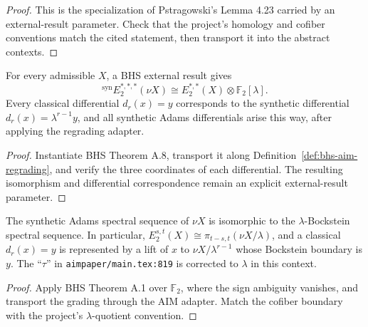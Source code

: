\begin{proof}
  This is the specialization of Pstragowski's Lemma 4.23 carried by an
  external-result parameter.  Check that the project's homology and cofiber
  conventions match the cited statement, then transport it into the abstract
  contexts.
\end{proof}

\begin{theorem}
  \label{thm:external-synthetic-rigidity}
  \notready
  For every admissible $X$, a BHS external result gives
  \[
    {}^{\mathrm{syn}}E_2^{*,*,*}(\nu X)
      \cong E_2^{*,*}(X)\otimes\mathbb F_2[\lambda].
  \]
  Every classical differential $d_r(x)=y$ corresponds to the synthetic
  differential $d_r(x)=\lambda^{r-1}y$, and all synthetic Adams differentials
  arise this way, after applying the regrading adapter.
\end{theorem}

\begin{proof}
  Instantiate BHS Theorem A.8, transport it along
  Definition~\ref{def:bhs-aim-regrading}, and verify the three coordinates of
  each differential.  The resulting isomorphism and differential
  correspondence remain an explicit external-result parameter.
\end{proof}

\begin{theorem}
  \label{thm:external-lambda-bockstein}
  \notready
  The synthetic Adams spectral sequence of $\nu X$ is isomorphic to the
  $\lambda$-Bockstein spectral sequence.  In particular,
  $E_2^{s,t}(X)\cong\pi_{t-s,t}(\nu X/\lambda)$, and a classical
  $d_r(x)=y$ is represented by a lift of $x$ to
  $\nu X/\lambda^{r-1}$ whose Bockstein boundary is $y$.  The ``$\tau$'' in
  \texttt{aimpaper/main.tex:819} is corrected to $\lambda$ in this context.
\end{theorem}

\begin{proof}
  Apply BHS Theorem A.1 over $\mathbb F_2$, where the sign ambiguity vanishes,
  and transport the grading through the AIM adapter.  Match the cofiber
  boundary with the project's $\lambda$-quotient convention.
\end{proof}

